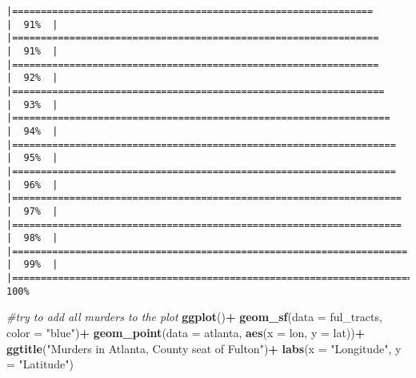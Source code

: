 \documentclass[
]{article}
\newenvironment{Shaded}{\begin{snugshade}}{\end{snugshade}}
\newcommand{\AttributeTok}[1]{\textcolor[rgb]{0.13,0.29,0.53}{#1}}
\newcommand{\CommentTok}[1]{\textcolor[rgb]{0.56,0.35,0.01}{\textit{#1}}}
\newcommand{\FunctionTok}[1]{\textcolor[rgb]{0.13,0.29,0.53}{\textbf{#1}}}
\newcommand{\NormalTok}[1]{#1}
\newcommand{\SpecialCharTok}[1]{\textcolor[rgb]{0.81,0.36,0.00}{\textbf{#1}}}
\newcommand{\StringTok}[1]{\textcolor[rgb]{0.31,0.60,0.02}{#1}}
\begin{document}
\begin{verbatim}
|===============================================================       |  91%  |                                                                              |================================================================      |  91%  |                                                                              |================================================================      |  92%  |                                                                              |=================================================================     |  93%  |                                                                              |==================================================================    |  94%  |                                                                              |===================================================================   |  95%  |                                                                              |===================================================================   |  96%  |                                                                              |====================================================================  |  97%  |                                                                              |====================================================================  |  98%  |                                                                              |===================================================================== |  99%  |                                                                              |======================================================================| 100%
\end{verbatim}

\begin{Shaded}
\begin{Highlighting}[]
\CommentTok{\#try to add all murders to the plot}
\FunctionTok{ggplot}\NormalTok{()}\SpecialCharTok{+}
  \FunctionTok{geom\_sf}\NormalTok{(}\AttributeTok{data =}\NormalTok{ ful\_tracts, }\AttributeTok{color =} \StringTok{"blue"}\NormalTok{)}\SpecialCharTok{+}
  \FunctionTok{geom\_point}\NormalTok{(}\AttributeTok{data =}\NormalTok{ atlanta, }\FunctionTok{aes}\NormalTok{(}\AttributeTok{x =}\NormalTok{ lon, }\AttributeTok{y =}\NormalTok{ lat))}\SpecialCharTok{+}
  \FunctionTok{ggtitle}\NormalTok{(}\StringTok{"Murders in Atlanta, County seat of Fulton"}\NormalTok{)}\SpecialCharTok{+}
  \FunctionTok{labs}\NormalTok{(}\AttributeTok{x =} \StringTok{"Longitude"}\NormalTok{, }\AttributeTok{y =} \StringTok{"Latitude"}\NormalTok{)}
\end{Highlighting}
\end{Shaded}
\end{document}
